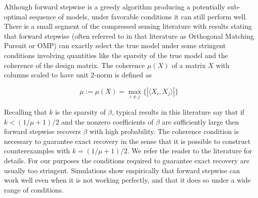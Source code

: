 \documentclass{imsart}
\newcommand{\innerp}[2]{\langle #1 , #2 \rangle}
\begin{document}
Although forward stepwise is a greedy algorithm producing a
potentially sub-optimal sequence of models, under favorable conditions
it can still perform well. There is a small segment of the
compressed sensing literature \citep{donoho:pursuit, cai:wang:omp}
with results stating that forward stepwise (often referred to in that
literature as Orthogonal Matching Pursuit or OMP) can exactly select
the true model
under some stringent conditions involving quantities like the sparsity
of the true model and the coherence of the design matrix. The
coherence $\mu(X)$ of a matrix $X$ with columns scaled to have unit
2-norm is defined as

\begin{equation}
  \mu := \mu(X) = \max_{i \neq j} \{ | \innerp{ X_i }{ X_j } | \}
\end{equation}

Recalling that $k$ is the sparsity of $\beta$, typical results in this
literature say that if $k < (1/\mu + 1)/2$ and the nonzero
coefficients of $\beta$ are sufficiently large then forward stepwise
recovers $\beta$ with high probability. The coherence condition is
necessary to guarantee exact recovery \citep{cai:wang:xu:sharp} in the
sense that it is possible to construct counterexamples with
$k = (1/\mu + 1)/2$. We refer the reader to the literature for details.
For our purposes the
conditions required to guarantee exact recovery are usually too
stringent. Simulations show empirically that forward
stepwise can work well even when it is not working perfectly, and that
it does so under a wide range of conditions.
\end{document}

